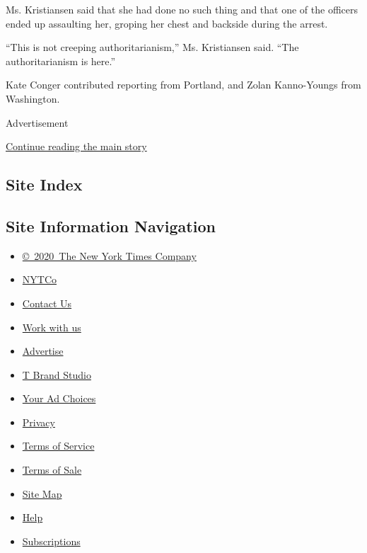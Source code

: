 Ms. Kristiansen said that she had done no such thing and that one of the
officers ended up assaulting her, groping her chest and backside during
the arrest.

``This is not creeping authoritarianism,'' Ms. Kristiansen said. ``The
authoritarianism is here.''

Kate Conger contributed reporting from Portland, and Zolan Kanno-Youngs
from Washington.

Advertisement

\protect\hyperlink{after-bottom}{Continue reading the main story}

\hypertarget{site-index}{%
\subsection{Site Index}\label{site-index}}

\hypertarget{site-information-navigation}{%
\subsection{Site Information
Navigation}\label{site-information-navigation}}

\begin{itemize}
\tightlist
\item
  \href{https://help.nytimes3xbfgragh.onion/hc/en-us/articles/115014792127-Copyright-notice}{©~2020~The
  New York Times Company}
\end{itemize}

\begin{itemize}
\tightlist
\item
  \href{https://www.nytco.com/}{NYTCo}
\item
  \href{https://help.nytimes3xbfgragh.onion/hc/en-us/articles/115015385887-Contact-Us}{Contact
  Us}
\item
  \href{https://www.nytco.com/careers/}{Work with us}
\item
  \href{https://nytmediakit.com/}{Advertise}
\item
  \href{http://www.tbrandstudio.com/}{T Brand Studio}
\item
  \href{https://www.nytimes3xbfgragh.onion/privacy/cookie-policy\#how-do-i-manage-trackers}{Your
  Ad Choices}
\item
  \href{https://www.nytimes3xbfgragh.onion/privacy}{Privacy}
\item
  \href{https://help.nytimes3xbfgragh.onion/hc/en-us/articles/115014893428-Terms-of-service}{Terms
  of Service}
\item
  \href{https://help.nytimes3xbfgragh.onion/hc/en-us/articles/115014893968-Terms-of-sale}{Terms
  of Sale}
\item
  \href{https://spiderbites.nytimes3xbfgragh.onion}{Site Map}
\item
  \href{https://help.nytimes3xbfgragh.onion/hc/en-us}{Help}
\item
  \href{https://www.nytimes3xbfgragh.onion/subscription?campaignId=37WXW}{Subscriptions}
\end{itemize}

